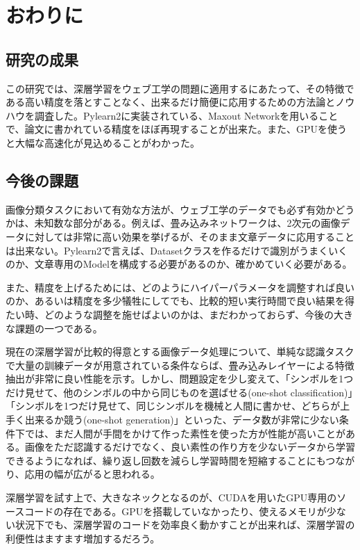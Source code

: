 \chapter{おわりに}
\section{研究の成果}
この研究では、深層学習をウェブ工学の問題に適用するにあたって、その特徴である高い精度を落とすことなく、出来るだけ簡便に応用するための方法論とノウハウを調査した。Pylearn2に実装されている、Maxout Networkを用いることで、論文に書かれている精度をほぼ再現することが出来た。また、GPUを使うと大幅な高速化が見込めることがわかった。

\section{今後の課題}
画像分類タスクにおいて有効な方法が、ウェブ工学のデータでも必ず有効かどうかは、未知数な部分がある。例えば、畳み込みネットワークは、2次元の画像データに対しては非常に高い効果を挙げるが、そのまま文章データに応用することは出来ない。Pylearn2で言えば、Datasetクラスを作るだけで識別がうまくいくのか、文章専用のModelを構成する必要があるのか、確かめていく必要がある。\par
また、精度を上げるためには、どのようにハイパーパラメータを調整すれば良いのか、あるいは精度を多少犠牲にしてでも、比較的短い実行時間で良い結果を得たい時、どのような調整を施せばよいのかは、まだわかっておらず、今後の大きな課題の一つである。\par
現在の深層学習が比較的得意とする画像データ処理について、単純な認識タスクで大量の訓練データが用意されている条件ならば、畳み込みレイヤーによる特徴抽出が非常に良い性能を示す。しかし、問題設定を少し変えて、「シンボルを1つだけ見せて、他のシンボルの中から同じものを選ばせる(one-shot classification)」「シンボルを1つだけ見せて、同じシンボルを機械と人間に書かせ、どちらが上手く出来るか競う(one-shot generation)」といった、データ数が非常に少ない条件下では、まだ人間が手間をかけて作った素性を使った方が性能が高いことがある\cite{lake2013one}。画像をただ認識するだけでなく、良い素性の作り方を少ないデータから学習できるようになれば、繰り返し回数を減らし学習時間を短縮することにもつながり、応用の幅が広がると思われる。\par
深層学習を試す上で、大きなネックとなるのが、CUDAを用いたGPU専用のソースコードの存在である。GPUを搭載していなかったり、使えるメモリが少ない状況下でも、深層学習のコードを効率良く動かすことが出来れば、深層学習の利便性はますます増加するだろう。\par
